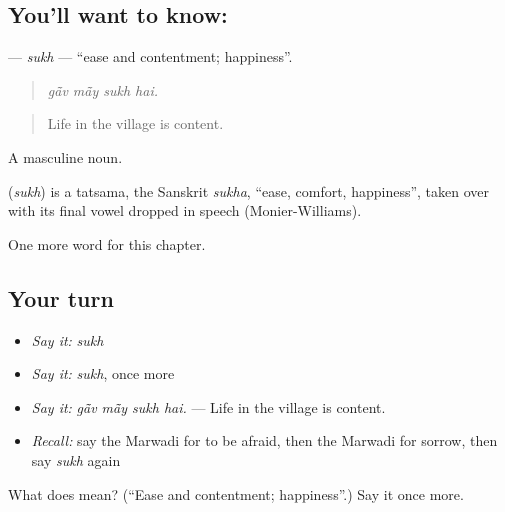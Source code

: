 \subsection*{You'll want to know: }
\textbf{} — \emph{sukh} — \textquotedblleft{}ease and contentment; happiness\textquotedblright{}.

\begin{quote}
   
\end{quote}

\begin{quote}
\emph{gā̃v mā̃y sukh hai.}
\end{quote}

\begin{quote}
Life in the village is content.
\end{quote}

A masculine noun.

\begin{cousinweb}
\textbf{} (\emph{sukh}) is a tatsama, the Sanskrit \emph{sukha}, \textquotedblleft{}ease, comfort, happiness\textquotedblright{}, taken over with its final vowel dropped in speech (Monier-Williams).
\end{cousinweb}

\begin{grammarlens}[title={What you've built}]
One more word for this chapter.
\end{grammarlens}

\subsection*{Your turn}
\begin{itemize}
\raggedright
  \item \emph{Say it:} \emph{sukh}
  \item \emph{Say it:} \emph{sukh}, once more
  \item \emph{Say it:} \emph{gā̃v mā̃y sukh hai.} — Life in the village is content.
  \item \emph{Recall:} say the Marwadi for to be afraid, then the Marwadi for sorrow, then say \emph{sukh} again
\end{itemize}

\begin{tcolorbox}[breakable,colback=teal!4,colframe=teal!35!black,title={Before you move on}]
What does  mean? (\textquotedblleft{}Ease and contentment; happiness\textquotedblright{}.) Say it once more.
\end{tcolorbox}
